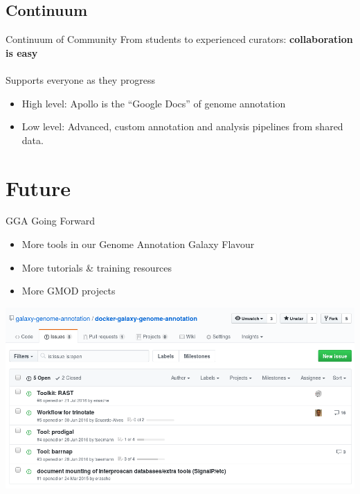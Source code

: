 \documentclass[12pt]{phage3slides} %
\begin{document}
\subsection{Continuum}
\begin{frame}{Continuum of Community}
    From students to experienced curators: \textbf{collaboration is easy}
    \ \\\ \\
    Supports everyone as they progress

    \begin{itemize}
        \item High level: Apollo is the ``Google Docs'' of genome annotation
        \item Low level: Advanced, custom annotation and analysis pipelines from shared data.
    \end{itemize}
\end{frame}

\section{Future}
\begin{frame}{GGA Going Forward}
    \begin{itemize}
        \item More tools in our Genome Annotation Galaxy Flavour
        \item More tutorials \& training resources
        \item More GMOD projects
    \end{itemize}
    \includegraphics[width=\textwidth]{img/issues}
\end{frame}
\end{document}
